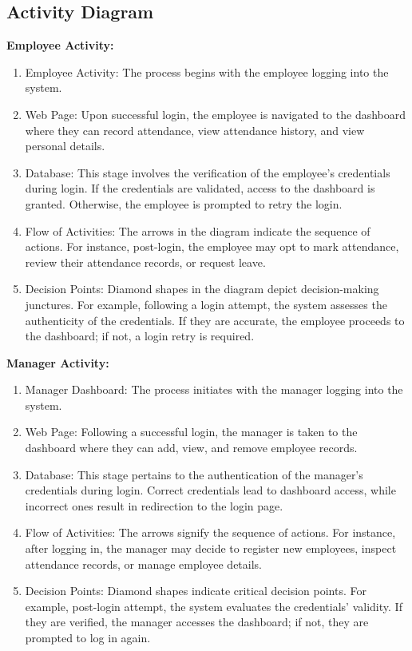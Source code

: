 \documentclass[a4paper, 12pt]{article}
\begin{document}
\subsection{Activity Diagram}
\textbf{Employee Activity:}
\begin{enumerate}
    \item Employee Activity: The process begins with the employee logging into the system.
    \item Web Page: Upon successful login, the employee is navigated to the dashboard where they can record attendance, view attendance history, and view personal details.
    \item Database: This stage involves the verification of the employee’s credentials during login. If the credentials are validated, access to the dashboard is granted. Otherwise, the employee is prompted to retry the login.
    \item Flow of Activities: The arrows in the diagram indicate the sequence of actions. For instance, post-login, the employee may opt to mark attendance, review their attendance records, or request leave.
    \item Decision Points: Diamond shapes in the diagram depict decision-making junctures. For example, following a login attempt, the system assesses the authenticity of the credentials. If they are accurate, the employee proceeds to the dashboard; if not, a login retry is required.
\end{enumerate}
\textbf{Manager Activity:}
\begin{enumerate}
    \item Manager Dashboard: The process initiates with the manager logging into the system.
    \item Web Page: Following a successful login, the manager is taken to the dashboard where they can add, view, and remove employee records.
    \item Database: This stage pertains to the authentication of the manager’s credentials during login. Correct credentials lead to dashboard access, while incorrect ones result in redirection to the login page.
    \item Flow of Activities: The arrows signify the sequence of actions. For instance, after logging in, the manager may decide to register new employees, inspect attendance records, or manage employee details.
    \item Decision Points: Diamond shapes indicate critical decision points. For example, post-login attempt, the system evaluates the credentials’ validity. If they are verified, the manager accesses the dashboard; if not, they are prompted to log in again.
\end{enumerate}
\end{document}
